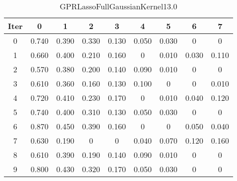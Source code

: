 \begin{table}
	\begin{center}
		\begin{tabular}{|c|c|c|c|c|c|c|c|c|}
			\hline
			Iter & 0 & 1 & 2 & 3 & 4 & 5 & 6 & 7 \\
			\hline
			0 & 0.740 & 0.390 & 0.330 & 0.130 & 0.050 & 0.030 & 0 & 0 \\
			\hline
			1 & 0.660 & 0.400 & 0.210 & 0.160 & 0 & 0.010 & 0.030 & 0.110 \\
			\hline
			2 & 0.570 & 0.380 & 0.200 & 0.140 & 0.090 & 0.010 & 0 & 0 \\
			\hline
			3 & 0.610 & 0.360 & 0.160 & 0.130 & 0.100 & 0 & 0 & 0.010 \\
			\hline
			4 & 0.720 & 0.410 & 0.230 & 0.170 & 0 & 0.010 & 0.040 & 0.120 \\
			\hline
			5 & 0.740 & 0.400 & 0.310 & 0.130 & 0.050 & 0.030 & 0 & 0 \\
			\hline
			6 & 0.870 & 0.450 & 0.390 & 0.160 & 0 & 0 & 0.050 & 0.040 \\
			\hline
			7 & 0.630 & 0.190 & 0 & 0 & 0.040 & 0.070 & 0.120 & 0.160 \\
			\hline
			8 & 0.610 & 0.390 & 0.190 & 0.140 & 0.090 & 0.010 & 0 & 0 \\
			\hline
			9 & 0.800 & 0.430 & 0.320 & 0.170 & 0.050 & 0.030 & 0 & 0 \\
			\hline
		\end{tabular}
	\end{center}
	\caption{GPRLassoFullGaussianKernel13.0}
\end{table}